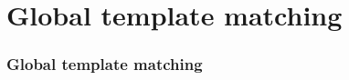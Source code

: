 \section{Global template matching}

\begin{frame}
	\frametitle{Global template matching}
	
\end{frame}
